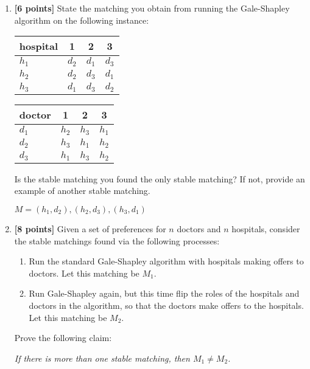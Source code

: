 \documentclass[11pt]{article}
\theoremstyle{definition}
\theoremstyle{theorem}
\newcommand{\solution}{\medskip\noindent{\color{DarkBlue}\textbf{Solution:}}}
\begin{document}
\begin{enumerate}[label=(\alph*)]
\item  \textbf{[6 points]} State the matching you obtain from running the Gale-Shapley algorithm on the following instance:

\begin{center}
\begin{tabular}{|l|c|c|c|}
\hline
hospital & 1 & 2 & 3  \\
\hline
$h_1$ & $d_2$ & $d_1$ & $d_3$   \\
$h_2$ & $d_2$ & $d_3$ & $d_1$   \\
$h_3$ & $d_1$ & $d_3$ & $d_2$   \\
\hline
\end{tabular}
\hspace{1in}
\begin{tabular}{|l|c|c|c|}
\hline
doctor & 1 & 2 & 3  \\
\hline
$d_1$ & $h_2$ & $h_3$ & $h_1$   \\
$d_2$ & $h_3$ & $h_1$ & $h_2$   \\
$d_3$ & $h_1$ & $h_3$ & $h_2$    \\
\hline
\end{tabular}
\end{center}

 Is the stable matching you found the only stable matching? If not, provide an example of another stable matching.

\solution

$ M = (h_1, d_2), (h_2, d_3), (h_3, d_1)$

\item \textbf{[8 points]} Given a set of preferences for $n$ doctors and $n$ hospitals, consider the stable matchings found via the following processes:

\begin{enumerate}
\item Run the standard Gale-Shapley algorithm with hospitals making offers to doctors. Let this matching be $M_1$.
\item Run Gale-Shapley again, but this time flip the roles of the hospitals and doctors in the algorithm, so that the doctors make offers to the hospitals. Let this matching be $M_2$.

\end{enumerate}

Prove the following claim:

\emph{If there is more than one stable matching, then $M_1 \neq M_2$.}


\end{enumerate}
\end{document}

